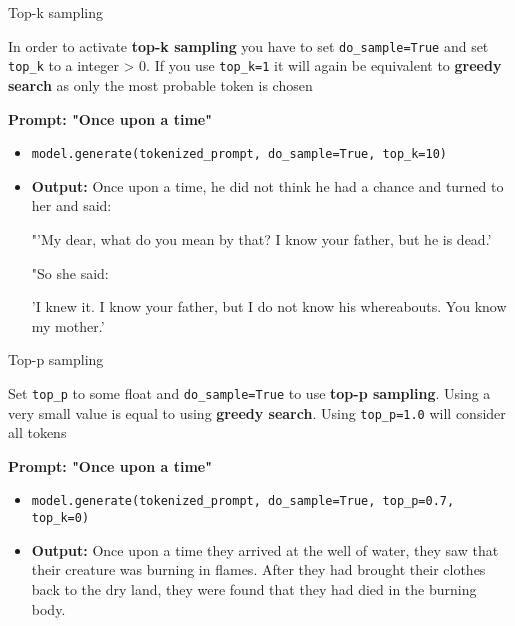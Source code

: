 \begin{vbframe}{Top-k sampling}

\vfill

In order to activate \textbf{top-k sampling} you have to set \texttt{do\_sample=True} and set \texttt{top\_k} to a integer > 0. If you use \texttt{top\_k=1} it will again be equivalent to \textbf{greedy search} as only the most probable token is chosen

\hspace{}

\textbf{Prompt: "Once upon a time"}

\begin{itemize}
    \item \texttt{model.generate(tokenized\_prompt, do\_sample=True, top\_k=10)}
    \item \textbf{Output:} Once upon a time, he did not think he had a chance and turned to her and said:

"'My dear, what do you mean by that? I know your father, but he is dead.'

"So she said:

'I knew it. I know your father, but I do not know his whereabouts. You know my mother.'
\end{itemize}

\vfill

\end{vbframe}


\begin{vbframe}{Top-p sampling}

\vfill

Set \texttt{top\_p} to some float and \texttt{do\_sample=True} to use \textbf{top-p sampling}. Using a very small value is equal to using \textbf{greedy search}. Using \texttt{top\_p=1.0} will consider all tokens

\hspace{}

\textbf{Prompt: "Once upon a time"}

\begin{itemize}
    \item \texttt{model.generate(tokenized\_prompt, do\_sample=True, top\_p=0.7, top\_k=0)}
    \item \textbf{Output:} Once upon a time they arrived at the well of water, they saw that their creature was burning in flames. After they had brought their clothes back to the dry land, they were found that they had died in the burning body.
\end{itemize}

\vfill
    
\end{vbframe}

